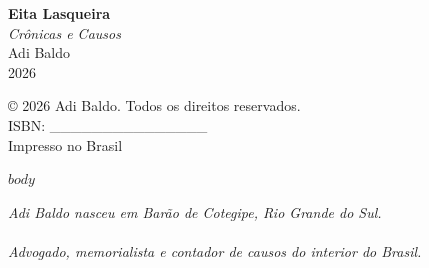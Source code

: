 \documentclass[11pt,twoside,openright]{book}
\begin{document}
\begin{titlepage}
\thispagestyle{empty}
\vspace*{\fill}
\begin{center}
  {\fontsize{32}{38}\selectfont\bfseries Eita Lasqueira}\\[16pt]
  {\large\itshape Crônicas e Causos}\\[32pt]
  {\Large Adi Baldo}\\[48pt]
  {\normalsize 2026}
\end{center}
\vspace*{\fill}
\end{titlepage}

\newpage
\thispagestyle{empty}
\vspace*{\fill}
\begin{flushleft}
{\small
© 2026 Adi Baldo. Todos os direitos reservados.\\[8pt]
ISBN: \_\_\_\_\_\_\_\_\_\_\_\_\_\_\_\\[8pt]
Impresso no Brasil
}
\end{flushleft}
\vspace*{\fill}

\tableofcontents
\cleardoublepage

$body$

\cleardoublepage
\thispagestyle{empty}
\vspace*{\fill}
\begin{center}
{\small\itshape
Adi Baldo nasceu em Barão de Cotegipe, Rio Grande do Sul.\\\\
Advogado, memorialista e contador de causos do interior do Brasil.
}
\end{center}
\vspace*{\fill}
\end{document}
